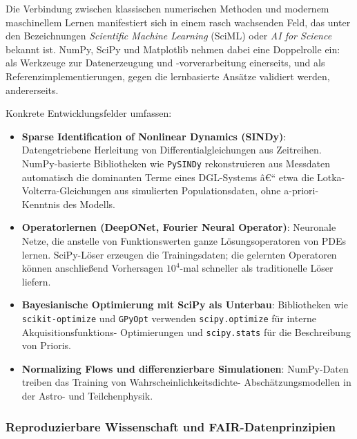 \documentclass[12pt, a4paper]{article}
\begin{document}
Die Verbindung zwischen klassischen numerischen Methoden und modernem
maschinellem Lernen manifestiert sich in einem rasch wachsenden Feld,
das unter den Bezeichnungen \emph{Scientific Machine Learning} (SciML)
oder \emph{AI for Science} bekannt ist. NumPy, SciPy und Matplotlib
nehmen dabei eine Doppelrolle ein: als Werkzeuge zur Datenerzeugung und
-vorverarbeitung einerseits, und als Referenzimplementierungen, gegen
die lernbasierte Ansätze validiert werden, andererseits.

Konkrete Entwicklungsfelder umfassen:

\begin{itemize}
  \item \textbf{Sparse Identification of Nonlinear Dynamics (SINDy)}:
    Datengetriebene Herleitung von Differentialgleichungen aus Zeitreihen.
    NumPy-basierte Bibliotheken wie \texttt{PySINDy} rekonstruieren aus
    Messdaten automatisch die dominanten Terme eines DGL-Systems â€“
    etwa die Lotka-Volterra-Gleichungen aus simulierten Populationsdaten,
    ohne a-priori-Kenntnis des Modells.

  \item \textbf{Operatorlernen (DeepONet, Fourier Neural Operator)}:
    Neuronale Netze, die anstelle von Funktionswerten ganze Lösungsoperatoren
    von PDEs lernen. SciPy-Löser erzeugen die Trainingsdaten; die gelernten
    Operatoren können anschließend Vorhersagen $10^4$-mal schneller als
    traditionelle Löser liefern.

  \item \textbf{Bayesianische Optimierung mit SciPy als Unterbau}:
    Bibliotheken wie \texttt{scikit-optimize} und \texttt{GPyOpt}
    verwenden \texttt{scipy.optimize} für interne Akquisitionsfunktions-
    Optimierungen und \texttt{scipy.stats} für die Beschreibung von
    Prioris.

  \item \textbf{Normalizing Flows und differenzierbare Simulationen}:
    NumPy-Daten treiben das Training von Wahrscheinlichkeitsdichte-
    Abschätzungsmodellen in der Astro- und Teilchenphysik.
\end{itemize}

\subsubsection{Reproduzierbare Wissenschaft und FAIR-Datenprinzipien}
\label{subsubsec:fair}
\end{document}

